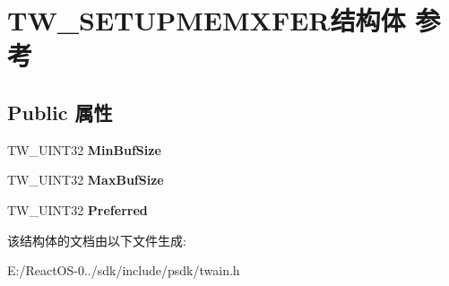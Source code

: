 \hypertarget{struct_t_w___s_e_t_u_p_m_e_m_x_f_e_r}{}\section{T\+W\+\_\+\+S\+E\+T\+U\+P\+M\+E\+M\+X\+F\+E\+R结构体 参考}
\label{struct_t_w___s_e_t_u_p_m_e_m_x_f_e_r}
\subsection*{Public 属性}
\begin{DoxyCompactItemize}
\item 
\mbox{\label{struct_t_w___s_e_t_u_p_m_e_m_x_f_e_r_a086ac45ae95813006a4bcdc1c2db986a}} 
T\+W\+\_\+\+U\+I\+N\+T32 {\bfseries Min\+Buf\+Size}
\item 
\mbox{\label{struct_t_w___s_e_t_u_p_m_e_m_x_f_e_r_a1dd80a5c09c6dac2a53d1ba5b2196423}} 
T\+W\+\_\+\+U\+I\+N\+T32 {\bfseries Max\+Buf\+Size}
\item 
\mbox{\label{struct_t_w___s_e_t_u_p_m_e_m_x_f_e_r_a4bf2c2339635b625b066f36feeaa4aba}} 
T\+W\+\_\+\+U\+I\+N\+T32 {\bfseries Preferred}
\end{DoxyCompactItemize}


该结构体的文档由以下文件生成\+:\begin{DoxyCompactItemize}
\item 
E\+:/\+React\+O\+S-\/0../sdk/include/psdk/twain.\+h\end{DoxyCompactItemize}
